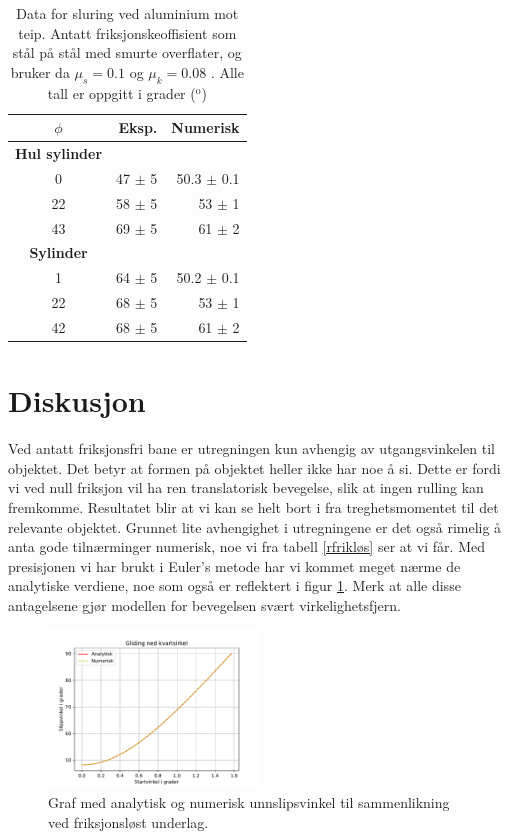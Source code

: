 \documentclass[5p]{elsarticle}
\begin{document}
	\begin{table}[H]
	    \begin{center}
	        \caption{Data for sluring ved aluminium mot teip. Antatt friksjonskeoffisient som stål på stål med smurte overflater, og bruker da $\mu _s = 0.1$ og $\mu _k = 0.08$ \cite{Haugan}. Alle tall er oppgitt i grader ($^{\text{o}}$)}
	        \label{sluring}
	        \begin{tabular}{|crr|}
	            \hline
				$\phi$  &  Eksp. & Numerisk  \\
				\hline \hline
				\textbf{Hul sylinder} & &  \\
				0   &  47 $\pm$ 5  &  50.3 $\pm$ 0.1   \\
				22  &  58 $\pm$ 5  &  53 $\pm$ 1   \\
				43  &  69 $\pm$ 5  &  61 $\pm$ 2    \\
				\hline \hline
				\textbf{Sylinder} & &  \\
				1   &  64 $\pm$ 5  &  50.2 $\pm$ 0.1   \\
				22  &  68 $\pm$ 5  &  53 $\pm$ 1   \\
				42  &  68 $\pm$ 5  &  61 $\pm$ 2   \\
				\hline
	        \end{tabular}
	    \end{center}
	\end{table}
	
	\section{Diskusjon}
	
	Ved antatt friksjonsfri bane er utregningen kun avhengig av utgangsvinkelen til objektet. Det betyr at formen på objektet heller ikke har noe å si. Dette er fordi vi ved null friksjon vil ha ren translatorisk bevegelse, slik at ingen rulling kan fremkomme. Resultatet blir at vi kan se helt bort i fra treghetsmomentet til det relevante objektet. Grunnet lite avhengighet i utregningene er det også rimelig å anta gode tilnærminger numerisk, noe vi fra tabell \ref{rfrikløs} ser at vi får. Med presisjonen vi har brukt i Euler's metode har vi kommet meget nærme de analytiske verdiene, noe som også er reflektert i figur \ref{frikløs}. Merk at alle disse antagelsene gjør modellen for bevegelsen svært virkelighetsfjern.
	
	\begin{figure}[H]
	    \centering
	    \includegraphics[width=0.5\textwidth]{Figure_0}
	    \caption{Graf med analytisk og numerisk unnslipsvinkel til sammenlikning ved friksjonsløst underlag.}
	    \label{frikløs}
	\end{figure}
	
\end{document}
